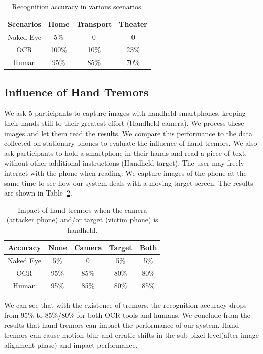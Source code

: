 \begin{table}[!t]
    \centering
    \caption{Recognition accuracy in various scenarios.}
    \begin{tabular}{@{}cccc@{}}
        \toprule
    Scenarios & Home & Transport & Theater \\ \midrule
    Naked Eye & 5\% & 0 & 0\\ 
    \midrule
    OCR & 100\% & 10\% & 23\%\\ 
    Human & 95\% & 85\% & 70\%\\ \bottomrule
    \end{tabular}
    \label{table-scenarios}
\end{table}

\subsection{Influence of Hand Tremors}
We ask 5 participants to capture images with handheld smartphones, keeping their hands still to their greatest effort (Handheld camera). We process these images and let them read the results. We compare this performance to the data collected on stationary phones to evaluate the influence of hand tremors.
We also ask participants to hold a smartphone in their hands and read a piece of text, without other additional instructions (Handheld target). The user may freely interact with the phone when reading. We capture images of the phone at the same time to see how our system deals with a moving target screen. The results are shown in Table~\ref{table-tremor}.

\begin{table}[!t] 
    \centering
    \caption{Impact of hand tremors when the camera (attacker phone) and/or target (victim phone) is handheld.}
    \begin{tabular}{ccccc}
        \toprule
    Accuracy & None & Camera & Target & Both  \\
    \midrule
    Naked Eye & 5\% & 0 & 5\% & 5\%\\ 
    \midrule
    OCR & 95\% & 85\% & 80\% & 80\%\\ 
    Human & 95\% & 85\% & 80\% & 85\%\\ \bottomrule
    \end{tabular}
    \label{table-tremor}
\end{table}

We can see that with the existence of tremors, the recognition accuracy drops from 95\% to 85\%/80\% for both OCR tools and humans. We conclude from the results that hand tremors can impact the performance of our system. Hand tremors can cause motion blur and erratic shifts in the sub-pixel level(after image alignment phase) and impact performance.


